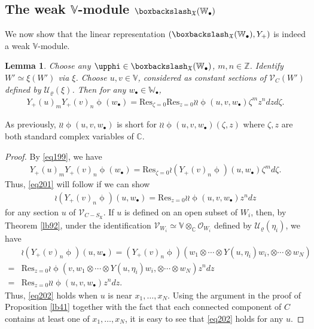 \documentclass[12pt,b5paper,notitlepage]{report}
\theoremstyle{definition}
\theoremstyle{plain}
\newtheorem{lm}[df]{Lemma}
\newcommand{\fk}{\mathfrak}
\newcommand{\mc}{\mathcal}
\newcommand{\Res}{\mathrm{Res}}
\newcommand{\scr}{\mathscr}
\newcommand{\SX}{S_{\fk X}}
\newcommand{\blt}{\bullet}
\newcommand{\Vbb}{\mathbb V}
\newcommand{\Wbb}{\mathbb W}
\newcommand{\Cbb}{\mathbb C}
\newcommand{\Zbb}{\mathbb Z}
\numberwithin{equation}{section}
\begin{document}
\subsection*{The weak $\Vbb$-module $\boxbackslash_{\fk X}(\Wbb_\blt)$}


We now show that the linear representation  $(\boxbackslash_{\fk X}(\Wbb_\blt),Y_+)$ is indeed a weak $\Vbb$-module.

\begin{lm}\label{lb95}
Choose any $\upphi\in\boxbackslash_{\fk X}(\Wbb_\blt)$, $m,n\in\Zbb$. Identify $W'\simeq\xi(W')$ via $\xi$. Choose $u,v\in\Vbb$, considered as constant sections of $\scr V_C(W')$ defined by $\mc U_\varrho(\xi)$. Then for any $w_\blt\in\Wbb_\blt$,
\begin{align}
Y_+(u)_m Y_+(v)_n\upphi(w_\blt)=\Res_{\zeta=0}\Res_{z=0}\wr\wr\upphi(u,v,w_\blt)\zeta^m z^n dzd\zeta.\label{eq201}
\end{align}
\end{lm}

As previously, $\wr\wr\upphi(u,v,w_\blt)$ is short for $\wr\wr\upphi(u,v,w_\blt)(\zeta,z)$ where $\zeta,z$ are both standard complex variables of $\Cbb$.

\begin{proof}
By \eqref{eq199}, we have
\begin{align*}
Y_+(u)_m Y_+(v)_n\upphi(w_\blt)=\Res_{\zeta=0}\wr(Y_+(v)_n\upphi)(u,w_\blt)\zeta^md\zeta.
\end{align*}
Thus, \eqref{eq201} will follow if we can show
\begin{align}
\wr(Y_+(v)_n\upphi)(u,w_\blt)=\Res_{z=0}\wr\wr\upphi(u,v,w_\blt) z^n dz\label{eq202}
\end{align}
for any section $u$ of $\scr V_{C-\SX}$. If $u$ is defined on an open subset of $W_i$, then, by Theorem \ref{lb92}, under the identification $\scr V_{W_i}\simeq\Vbb\otimes_\Cbb\scr O_{W_i}$ defined by $\mc U_\varrho(\eta_i)$, we have
\begin{align*}
&\wr(Y_+(v)_n\upphi)(u,w_\blt)=(Y_+(v)_n\upphi)(w_1\otimes\cdots\otimes Y(u,\eta_i)w_i,\otimes\cdots\otimes w_N)\\
=&\Res_{z=0}\wr\upphi(v,w_1\otimes\cdots\otimes Y(u,\eta_i)w_i,\otimes\cdots\otimes w_N)z^ndz\\
=& \Res_{z=0}\wr\wr\upphi(u,v,w_\blt)z^ndz.
\end{align*}
Thus, \eqref{eq202} holds when $u$ is near $x_1,\dots,x_N$.  Using the argument in the proof of Proposition \ref{lb41} together with the fact that each connected component of $C$ contains at least one of $x_1,\dots,x_N$, it is easy to see that \eqref{eq202} holds for any $u$.
\end{proof}
\end{document}
